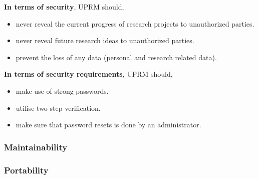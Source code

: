 \textbf{In terms of security}, UPRM should,
	\begin{itemize} 
		\item never reveal the current progress of research projects to unauthorized parties.
		\item never reveal future research ideas to unauthorized parties.
		\item prevent the loss of any data (personal and research related data).
	\end{itemize}

\textbf{In terms of security requirements}, UPRM should,
	\begin{itemize} 
		\item make use of strong passwords.
		\item utilise two step verification.
		\item make sure that password resets is done by an administrator.
	\end{itemize}

\subsubsection{Maintainability}

\subsubsection{Portability}